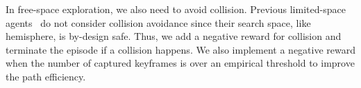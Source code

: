     In free-space exploration, we also need to avoid collision. Previous limited-space agents~\citep{lee2022uncertainty, zhan2022activermap, guedonscone} do not consider collision avoidance since their search space, like hemisphere, is by-design safe. Thus, we add a negative reward for collision and terminate the episode if a collision happens. We also implement a negative reward when the number of captured keyframes is over an empirical threshold to improve the path efficiency. %
    

